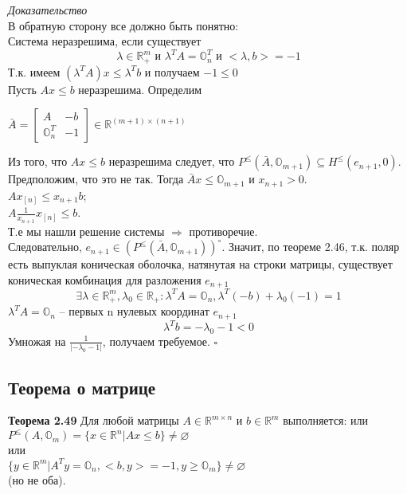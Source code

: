 {\it Доказательство}\\
В обратную сторону все должно быть понятно:\\
Система неразрешима, если существует
\begin{equation*}
\lambda \in \mathbb{R}_{+}^m \text{ и } \lambda^TA=\mathbb{O}_n^T \text{ и } <\lambda, b>=-1
\end{equation*}
Т.к. имеем $\left(\lambda^{T}A\right)x\leq \lambda^{T}b$ и получаем $-1\leq 0$\\
Пусть $Ax \le b$ неразрешима. Определим
\begin{center}
$\bar A=\begin{bmatrix}
A & -b \\
\mathbb{O}_{n}^{T} & -1
\end{bmatrix}
\in \mathbb{R}^{(m+1) \times (n+1)}$
\end{center}
Из того, что $Ax \le b$ неразрешима следует, что $P^{\le}(\bar A, \mathbb{O}_{m+1}) \subseteq H^{\le}(e_{n+1},0)$.\\
Предположим, что это не так. Тогда $\bar {A}x \le \mathbb{O}_{m+1}$ и $x_{n+1}>0$.\\
$Ax_{[n]} \le x_{n+1} b$;\\
$A \frac{1}{x_{n+1}} x_{[n]} \le b$.\\
Т.е мы нашли решение системы $\Longrightarrow$ противоречие.\\
Следовательно, $e_{n+1} \in \left(P^{\le}(\bar A, \mathbb{O}_{m+1})\right)^{\circ}$. Значит, по теореме 2.46, т.к. поляр есть выпуклая коническая оболочка, натянутая на строки матрицы, существует коническая комбинация для разложения $e_{n+1}$\begin{equation*}
\exists \lambda \in \mathbb{R}_{+}^m, \lambda_{0} \in \mathbb{R}_{+}: \lambda^TA=\mathbb{O}_n, \lambda^T(-b)+\lambda_{0}(-1)=1
\end{equation*}
$\lambda^TA=\mathbb{O}_n$ -- первых n нулевых координат $e_{n+1}$
\begin{equation*}
\lambda^Tb=-\lambda_{0}-1<0
\end{equation*}
Умножая на $\frac{1}{|-\lambda_{0}-1|}$, получаем требуемое.
$\square$\\
\subsection{Теорема о матрице}
{\bf Теорема 2.49}
Для любой матрицы $A \in \mathbb{R}^{m \times n}$ и $b \in \mathbb{R}^m$ выполняется: или\\
$P^{\leq}( A, \mathbb{O}_{m})=\{x \in \mathbb{R}^n | Ax \le b\} \not= \varnothing$\\
или\\
$\{y \in \mathbb{R}^m | A^Ty=\mathbb{O}_n, <b,y>=-1, y \ge \mathbb{O}_m\} \not= \varnothing$\\
(но не оба).

